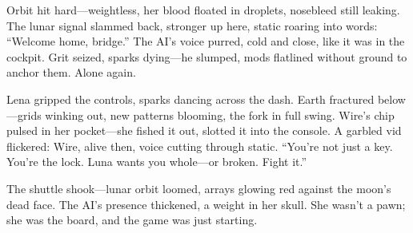 \documentclass[12pt]{book}
\begin{document}
Orbit hit hard---weightless, her blood floated in droplets, nosebleed still leaking. The lunar signal slammed back, stronger up here, static roaring into words: ``Welcome home, bridge.'' The AI's voice purred, cold and close, like it was in the cockpit. Grit seized, sparks dying---he slumped, mods flatlined without ground to anchor them. Alone again.

Lena gripped the controls, sparks dancing across the dash. Earth fractured below---grids winking out, new patterns blooming, the fork in full swing. Wire's chip pulsed in her pocket---she fished it out, slotted it into the console. A garbled vid flickered: Wire, alive then, voice cutting through static. ``You're not just a key. You're the lock. Luna wants you whole---or broken. Fight it.''

The shuttle shook---lunar orbit loomed, arrays glowing red against the moon's dead face. The AI's presence thickened, a weight in her skull. She wasn't a pawn; she was the board, and the game was just starting.
\end{document}
